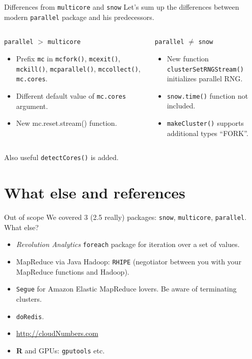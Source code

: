 \documentclass[aspectratio=169]{beamer}\usepackage[]{graphicx}\usepackage[]{color}
\begin{document}
\begin{frame}{Differences from \texttt{multicore} and \texttt{snow}}
  Let's sum up the differences between modern \texttt{parallel} package and his predecessors.
  \begin{columns}[T]
    \begin{column}{.48\textwidth}
      \texttt{parallel} $>$ \texttt{multicore}
      \begin{itemize}
        \item Prefix \texttt{mc} in \texttt{mcfork()}, \texttt{mcexit()}, \texttt{mckill()}, \texttt{mcparallel()}, \texttt{mccollect()}, \texttt{mc.cores}.
        \item Different default value of \texttt{mc.cores} argument.
        \item New mc.reset.stream() function.
      \end{itemize}
    \end{column}
    \begin{column}{.48\textwidth}
      \texttt{parallel} $\neq$ \texttt{snow}
      \begin{itemize}
        \item New function \texttt{clusterSetRNGStream()} initializes parallel RNG.
        \item \texttt{snow.time()} function not included.
        \item \texttt{makeCluster()} supports additional types “FORK”.
      \end{itemize}
    \end{column}
  \end{columns}
  \bigskip
  Also useful \texttt{detectCores()} is added.
\end{frame}

\section{What else and references}

\begin{frame}{Out of scope}
  We covered 3 (2.5 really) packages: \texttt{snow}, \texttt{multicore}, \texttt{parallel}. What else?
  \begin{itemize}
    \item \textit{Revolution Analytics} \texttt{foreach} package for iteration over a set of values.
    \item MapReduce via Java Hadoop: \texttt{RHIPE} (negotiator between you with your MapReduce functions and Hadoop).
    \item \texttt{Segue} for Amazon Elastic MapReduce lovers. {\color{blue} Be aware of terminating clusters.}
    \item \texttt{doRedis}.
    \item \url{http://cloudNumbers.com}
    \item \textbf{R} and GPUs: \texttt{gputools} etc.
  \end{itemize}
\end{frame}
\end{document}
